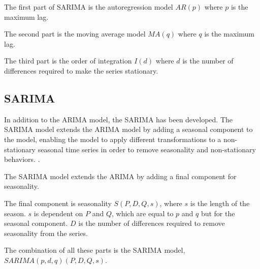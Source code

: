 The first part of SARIMA is the autoregression model
$AR(p)$ where $p$ is the maximum lag.

The second part is the moving average model $MA(q)$ where $q$ is the maximum lag.

The third part is the order of integration $I(d)$ where $d$ is the number of
differences required to make the series stationary.


\subsection{SARIMA}
In addition to the ARIMA model, the SARIMA has been developed.
The SARIMA model extends the ARIMA model by adding a seasonal component to the model,
enabling the model to apply different transformations to a non-stationary seasonal time series in order to remove seasonality and non-stationary behaviors.
\citep[p. 327-385]{Utlaut2008}.

The SARIMA model extends the ARIMA by adding a final component for seasonality.

The final component is seasonality $S(P, D, Q, s)$, where $s$ is the length
of the season.
$s$ is dependent on $P$ and $Q$, which are equal to $p$ and $q$ but for the seasonal component.
$D$ is the number of differences required to remove seasonality from the series.

The combination of all these parts is the SARIMA model,
$SARIMA(p, d, q)(P, D, Q, s)$.




\iffalse
\subsection{SARIMA}
SARIMA is an extension to the ARMA model that supports the direct modeling of a seasonal component and incorporates a parameter $d$
to transform a non-stationary time-series into a stationary one.

The main idea is to apply different transformations to a non-stationary seasonal time-series
in order to remove seasonality and any non-stationary behaviors
\citep[p. 327-385]{Utlaut2008}.
The first part of SARIMA is the autoregression model
$AR(p)$ where $p$ is the maximum lag.

The second part is the moving average model $MA(q)$ where $q$ is the maximum lag.

The third part is the order of integration $I(d)$ where $d$ is the number of
differences required to make the series stationary.

The final component is seasonality $S(P, D, Q, s)$, where $s$ is the length
of the season.
$s$ is dependent on $P$ and $Q$, which are equal to $p$ and $q$ but for the seasonal component.
$D$ is the number of differences required to remove seasonality from the series.

The combination of all these parts is the SARIMA model,
$SARIMA(p, d, q)(P, D, Q, s)$.

\textbf{ARIMA} is the same method as SARIMA, but without the seasonal component.
\fi
